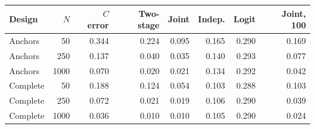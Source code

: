 \begin{tabular}{lrrrrrrr}
\toprule
Design & $N$ & $C$ error & Two-stage & Joint & Indep. & Logit & Joint, 100 \\
\midrule
Anchors & 50 & 0.344 & 0.224 & 0.095 & 0.165 & 0.290 & 0.169 \\
Anchors & 250 & 0.137 & 0.040 & 0.035 & 0.140 & 0.293 & 0.077 \\
Anchors & 1000 & 0.070 & 0.020 & 0.021 & 0.134 & 0.292 & 0.042 \\
Complete & 50 & 0.188 & 0.124 & 0.054 & 0.103 & 0.288 & 0.103 \\
Complete & 250 & 0.072 & 0.021 & 0.019 & 0.106 & 0.290 & 0.039 \\
Complete & 1000 & 0.036 & 0.010 & 0.010 & 0.105 & 0.290 & 0.024 \\
\bottomrule
\end{tabular}

